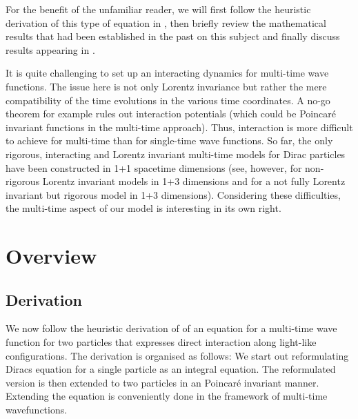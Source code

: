 \documentclass[b5paper,draft,openbib,12pt]{memoir}
\begin{document}
For the benefit of the unfamiliar reader, we will first follow the 
heuristic derivation of this type of equation
in \cite{direct_interaction_quantum}, then briefly review 
the mathematical results that 
had been established in the past on this subject 
and finally 
discuss results appearing in \cite{selfDirac,selfKG}.





It is quite challenging to set up an interacting dynamics 
  for multi-time wave functions. The issue here is not only Lorentz 
  invariance but rather the mere compatibility of the time 
  evolutions in the various time coordinates. A no-go theorem 
  \cite{nogo_potentials,deckert_nickel_2016} for example rules 
  out interaction potentials (which could be Poincar\'{e} 
  invariant functions in the multi-time approach). Thus, 
  interaction is more difficult to achieve for multi-time than for 
  single-time wave functions. So far, the only rigorous, 
  interacting and Lorentz invariant multi-time models for Dirac 
  particles have been constructed in 1+1 spacetime dimensions 
  \cite{1d_model,nt_model} (see, however, \cite{drozvincent_1981,
  sazdjian_2bd,2bdem} for non-rigorous Lorentz invariant models 
  in 1+3 dimensions and \cite[chap.\ 3]{phd_nickel} for a not 
  fully Lorentz invariant but rigorous model in 1+3 dimensions). 
  Considering these difficulties, the multi-time aspect of our 
  model is interesting in its own right.


\section{Overview}
\subsection{Derivation}

We now follow the heuristic derivation of \cite{direct_interaction_quantum} 
of an equation for a multi-time wave function for two particles  
that expresses direct interaction along light-like configurations. 
The derivation is organised as follows: We start out 
reformulating Diracs equation
for a single particle 
as an integral equation. The reformulated version is then 
extended to  two particles
in an Poincaré invariant manner. Extending the 
equation is conveniently done in 
the framework of multi-time wavefunctions.
\end{document}

